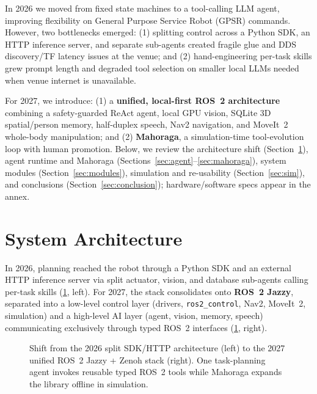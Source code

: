\documentclass[a4paper]{llncs}
\begin{document}
In 2026 we moved from fixed state machines to a tool-calling LLM agent, improving flexibility on General Purpose Service Robot (GPSR) commands. However, two bottlenecks emerged: (1) splitting control across a Python SDK, an HTTP inference server, and separate sub-agents created fragile glue and DDS discovery/TF latency issues at the venue; and (2) hand-engineering per-task skills grew prompt length and degraded tool selection on smaller local LLMs needed when venue internet is unavailable.

For 2027, we introduce: (1) a \textbf{unified, local-first ROS~2 architecture} combining a safety-guarded ReAct agent, local GPU vision, SQLite 3D spatial/person memory, half-duplex speech, Nav2 navigation, and MoveIt~2 whole-body manipulation; and (2) \textbf{Mahoraga}, a simulation-time tool-evolution loop with human promotion. Below, we review the architecture shift (Section~\ref{sec:architecture}), agent runtime and Mahoraga (Sections~\ref{sec:agent}--\ref{sec:mahoraga}), system modules (Section~\ref{sec:modules}), simulation and re-usability (Section~\ref{sec:sim}), and conclusions (Section~\ref{sec:conclusion}); hardware/software specs appear in the annex.

\section{System Architecture}
\label{sec:architecture}

In 2026, planning reached the robot through a Python SDK and an external HTTP inference server via split actuator, vision, and database sub-agents calling per-task skills (\cref{fig:arch-evolution}, left). For 2027, the stack consolidates onto \textbf{ROS~2 Jazzy}, separated into a low-level control layer (drivers, \texttt{ros2\_control}, Nav2, MoveIt~2, simulation) and a high-level AI layer (agent, vision, memory, speech) communicating exclusively through typed ROS~2 interfaces (\cref{fig:arch-evolution}, right).

\begin{figure}[tb]
  \centering
  \resizebox{0.89\textwidth}{!}{}
  \caption{Shift from the 2026 split SDK/HTTP architecture (left) to the 2027 unified ROS~2 Jazzy + Zenoh stack (right). One task-planning agent invokes reusable typed ROS~2 tools while Mahoraga expands the library offline in simulation.}
  \label{fig:arch-evolution}
\end{figure}
\end{document}
